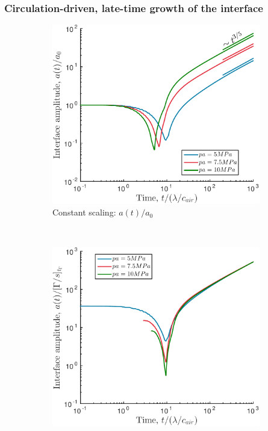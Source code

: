 \documentclass{article}
\begin{document}
\subsubsection{Circulation-driven, late-time growth of the interface}

\begin{figure}
  \centering
  \begin{subfigure}[b]{0.45\textwidth}
    \centering
    \includegraphics[width=\textwidth]{./figs/lung_figs/a0_t1000_unscaled_loglog_01-Nov-2016}
    \caption{\label{fig:trapz_interface_t1000} Constant scaling: $a(t)/a_0$}
  \end{subfigure}
  ~
  \begin{subfigure}[b]{0.45\textwidth}
    \centering
      \includegraphics[width=\textwidth]{./figs/lung_figs/a0_t1000_loglog28-Oct-2016}

\end{subfigure}
\end{figure}
\end{document}
